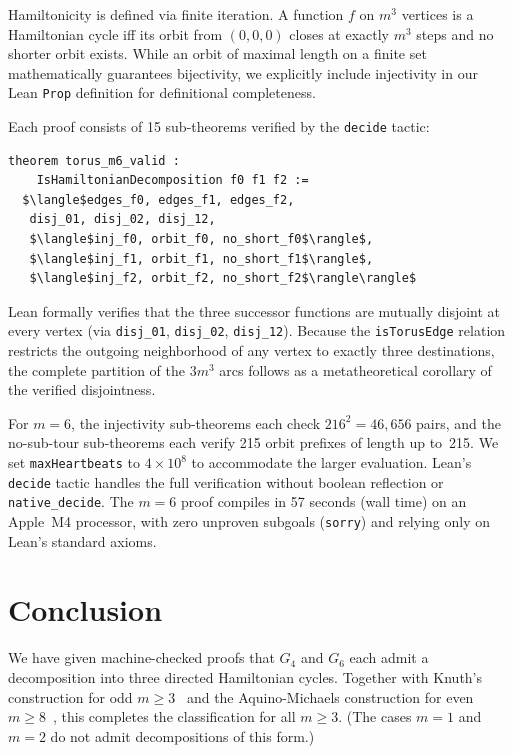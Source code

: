 \documentclass[11pt]{article}
\theoremstyle{plain}
\begin{document}
Hamiltonicity is defined via finite iteration. A function $f$ on $m^3$
vertices is a Hamiltonian cycle iff its orbit from $(0,0,0)$ closes at
exactly $m^3$ steps and no shorter orbit exists. While an orbit of
maximal length on a finite set mathematically guarantees bijectivity,
we explicitly include injectivity in our Lean \texttt{Prop} definition
for definitional completeness.

Each proof consists of 15 sub-theorems verified by the \texttt{decide}
tactic:
\begin{lstlisting}[language=ML,mathescape=true]
theorem torus_m6_valid :
    IsHamiltonianDecomposition f0 f1 f2 :=
  $\langle$edges_f0, edges_f1, edges_f2,
   disj_01, disj_02, disj_12,
   $\langle$inj_f0, orbit_f0, no_short_f0$\rangle$,
   $\langle$inj_f1, orbit_f1, no_short_f1$\rangle$,
   $\langle$inj_f2, orbit_f2, no_short_f2$\rangle\rangle$
\end{lstlisting}

Lean formally verifies that the three successor functions are
mutually disjoint at every vertex (via \texttt{disj\_01},
\texttt{disj\_02}, \texttt{disj\_12}). Because the
\texttt{isTorusEdge} relation restricts the outgoing neighborhood
of any vertex to exactly three destinations, the complete partition
of the $3m^3$ arcs follows as a metatheoretical corollary of the
verified disjointness.

For $m=6$, the injectivity sub-theorems each check $216^2 = 46{,}656$ pairs,
and the no-sub-tour sub-theorems each verify 215 orbit prefixes of length
up to~215. We set \texttt{maxHeartbeats} to $4 \times 10^8$ to accommodate
the larger evaluation. Lean's \texttt{decide} tactic handles the full
verification without boolean reflection or \texttt{native\_decide}.
The $m=6$ proof compiles in 57 seconds (wall time) on an Apple~M4
processor, with zero unproven subgoals (\texttt{sorry}) and relying
only on Lean's standard axioms.

\section{Conclusion}

We have given machine-checked proofs that $G_4$ and $G_6$ each admit a
decomposition into three directed Hamiltonian cycles. Together with
Knuth's construction for odd $m \ge 3$~\cite{knuth2026} and the
Aquino-Michaels construction for even $m \ge 8$~\cite{aquino2026},
this completes the classification for all $m \ge 3$.
(The cases $m=1$ and $m=2$ do not admit decompositions of this form.)
\end{document}
